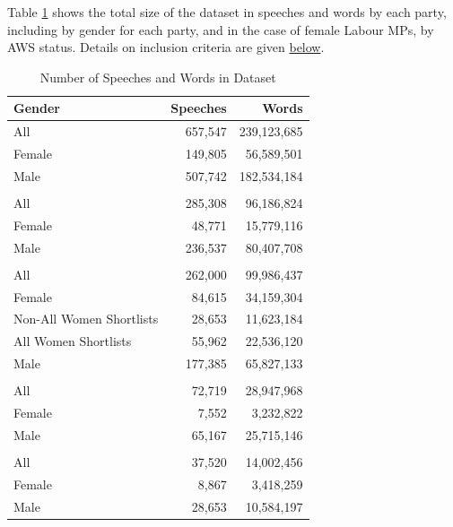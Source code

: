 \documentclass[]{article}
\theoremstyle{definition}
\theoremstyle{definition}
\theoremstyle{definition}
\theoremstyle{remark}
\begin{document}
Table \ref{tab:speech-stats-table} shows the total size of the dataset
in speeches and words by each party, including by gender for each party,
and in the case of female Labour MPs, by AWS status. Details on
inclusion criteria are given \protect\hyperlink{methodology}{below}.

\begin{table}[H]

\caption{\label{tab:speech-stats-table}Number of Speeches and Words in Dataset}
\centering
\begin{tabular}[t]{lrr}
\toprule
Gender & Speeches & Words\\
\midrule
All & 657,547 & 239,123,685\\
Female & 149,805 & 56,589,501\\
Male & 507,742 & 182,534,184\\
\addlinespace[0.3em]
\multicolumn{3}{l}{\textbf{Conservatives}}\\
\hspace{1em}All & 285,308 & 96,186,824\\
\hspace{1em}Female & 48,771 & 15,779,116\\
\hspace{1em}Male & 236,537 & 80,407,708\\
\addlinespace[0.3em]
\multicolumn{3}{l}{\textbf{Labour}}\\
\hspace{1em}All & 262,000 & 99,986,437\\
\hspace{1em}Female & 84,615 & 34,159,304\\
\hspace{1em}\hspace{1em}Non-All Women Shortlists & 28,653 & 11,623,184\\
\hspace{1em}\hspace{1em}All Women Shortlists & 55,962 & 22,536,120\\
\hspace{1em}Male & 177,385 & 65,827,133\\
\addlinespace[0.3em]
\multicolumn{3}{l}{\textbf{Liberal Democrat}}\\
\hspace{1em}All & 72,719 & 28,947,968\\
\hspace{1em}Female & 7,552 & 3,232,822\\
\hspace{1em}Male & 65,167 & 25,715,146\\
\addlinespace[0.3em]
\multicolumn{3}{l}{\textbf{Other}}\\
\hspace{1em}All & 37,520 & 14,002,456\\
\hspace{1em}Female & 8,867 & 3,418,259\\
\hspace{1em}Male & 28,653 & 10,584,197\\
\bottomrule
\end{tabular}
\end{table}
\end{document}
